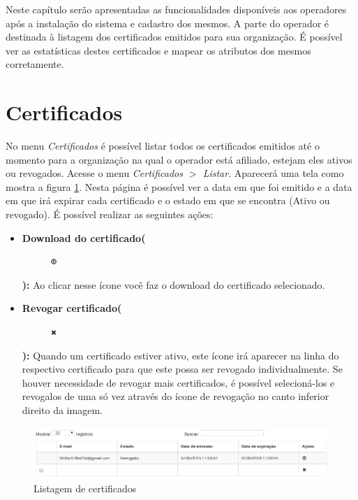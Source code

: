                   

Neste capítulo serão apresentadas as funcionalidades disponíveis aos operadores após a instalação do sistema e cadastro dos mesmos.
A parte do operador é destinada à listagem dos certificados emitidos para sua organização. É possível ver as estatísticas destes certificados e mapear os atributos dos mesmos corretamente.

\section{Certificados}

No menu \textit{Certificados} é possível listar todos os certificados emitidos até o momento para a organização na qual o operador está afiliado, estejam eles ativos ou revogados. Acesse o menu \textit{Certificados $>$ Listar}. Aparecerá uma tela como mostra a figura \ref{fig:listarcertop}. Nesta página é possível ver a data em que foi emitido e a data em que irá expirar cada certificado e o estado em que se encontra (Ativo ou revogado).
É possível realizar as seguintes ações:

\begin{itemize}

	\item \textbf{Download do certificado(}\begin{figure} \includegraphics[height=10]{images/iconedownload} \end{figure} \textbf{):} Ao clicar nesse ícone você faz o download do certificado selecionado.
	\item \textbf{Revogar certificado(}\begin{figure} \includegraphics[height=10]{images/iconedelete2} \end{figure} \textbf{):} Quando um certificado estiver ativo, este ícone irá aparecer na linha do respectivo certificado para que este possa ser revogado individualmente. Se houver necessidade de revogar mais certificados, é possível selecioná-los e revogalos de uma só vez através do ícone de revogação no canto inferior direito da imagem. 
	
\end{itemize}

\begin{figure}[ht]
     \centering
     \includegraphics[scale=0.5]{images/listarcertop.png}
     \caption{Listagem de certificados}
     \label{fig:listarcertop}
\end{figure}

